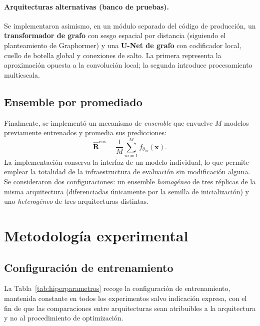 \paragraph{Arquitecturas alternativas (banco de pruebas).} Se implementaron asimismo, en un módulo
separado del código de producción, un \textbf{transformador de grafo} con sesgo espacial por
distancia (siguiendo el planteamiento de Graphormer) y una \textbf{U-Net de grafo} con codificador
local, cuello de botella global y conexiones de salto. La primera representa la aproximación
opuesta a la convolución local; la segunda introduce procesamiento multiescala.

\subsection{Ensemble por promediado}
\label{subsec:ensemble}

Finalmente, se implementó un mecanismo de \emph{ensemble} que envuelve $M$ modelos previamente
entrenados y promedia sus predicciones:
\begin{equation}
    \hat{\mathbf{R}}^{\text{ens}} = \frac{1}{M} \sum_{m=1}^{M} f_{\theta_m}(\mathbf{x}).
\end{equation}
La implementación conserva la interfaz de un modelo individual, lo que permite emplear la totalidad
de la infraestructura de evaluación sin modificación alguna. Se consideraron dos configuraciones:
un ensemble \emph{homogéneo} de tres réplicas de la misma arquitectura (diferenciadas únicamente por
la semilla de inicialización) y uno \emph{heterogéneo} de tres arquitecturas distintas.


\section{Metodología experimental}
\label{sec:metodologia}

\subsection{Configuración de entrenamiento}
\label{subsec:config-entrenamiento}

La Tabla~\ref{tab:hiperparametros} recoge la configuración de entrenamiento, mantenida constante en
todos los experimentos salvo indicación expresa, con el fin de que las comparaciones entre
arquitecturas sean atribuibles a la arquitectura y no al procedimiento de optimización.

